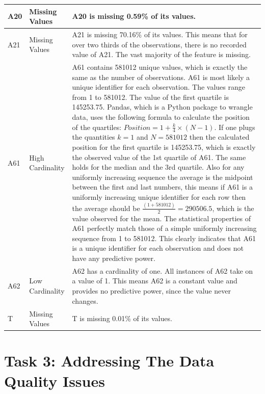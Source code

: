\documentclass[11pt]{report}
\begin{document}
\begin{longtable}{lp{4cm}p{7cm}}
\midrule
A20 & Missing Values & A20 is missing 0.59\% of its values. \\
\midrule
A21 & Missing Values & A21 is missing 70.16\% of its values. This means that for over two thirds of the observations, there is no recorded value of A21. The vast majority of the feature is missing. \\
\midrule
A61 & High Cardinality & A61 contains 581012 unique values, which is exactly the same as the number of observations. A61 is most likely a unique identifier for each observation. The values range from 1 to 581012. The value of the first quartile is 145253.75. Pandas, which is a Python package to wrangle data, uses the following formula to calculate the position of the quartiles: $Position = 1 + \frac{k}{4} \times (N - 1)$. If one plugs the quantities $k = 1$ and $N = 581012$ then the calculated position for the first quartile is 145253.75, which is exactly the observed value of the 1st quartile of A61. The same holds for the median and the 3rd quartile. Also for any uniformly increasing sequence the average is the midpoint between the first and last numbers, this means if A61 is a uniformly increasing unique identifier for each row then the average should be $\frac{(1 + 581012)}{2} = 290506.5$, which is the value observed for the mean. The statistical properties of A61 perfectly match those of a simple uniformly increasing sequence from 1 to 581012. This clearly indicates that A61 is a unique identifier for each observation and does not have any predictive power. \\
\midrule
A62 & Low Cardinality & A62 has a cardinality of one. All instances of A62 take on a value of 1. This means A62 is a constant value and provides no predictive power, since the value never changes. \\
\midrule
T & Missing Values & T is missing 0.01\% of its values. \\
\end{longtable}

\section*{Task 3: Addressing The Data Quality Issues}
\end{document}

